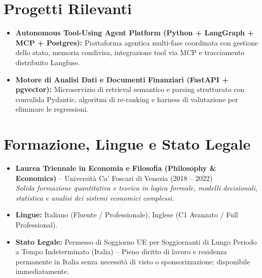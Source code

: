 \documentclass[a4paper,10pt]{article}
\begin{document}
\section{Progetti Rilevanti}
\begin{itemize}
  \item \textbf{Autonomous Tool-Using Agent Platform (Python + LangGraph + MCP + Postgres):} Piattaforma agentica multi-fase coordinata con gestione dello stato, memoria condivisa, integrazione tool via MCP e tracciamento distribuito Langfuse.
  \item \textbf{Motore di Analisi Dati e Documenti Finanziari (FastAPI + pgvector):} Microservizio di retrieval semantico e parsing strutturato con convalida Pydantic, algoritmi di re-ranking e harness di valutazione per eliminare le regressioni.
\end{itemize}

\section{Formazione, Lingue e Stato Legale}
\begin{itemize}
  \item \textbf{Laurea Triennale in Economia e Filosofia (Philosophy \& Economics)} -- Università Ca' Foscari di Venezia (2018 -- 2022) \\
  \textit{Solida formazione quantitativa e teorica in logica formale, modelli decisionali, statistica e analisi dei sistemi economici complessi.}
  \item \textbf{Lingue:} Italiano (Fluente / Professionale), Inglese (C1 Avanzato / Full Professional).
  \item \textbf{Stato Legale:} Permesso di Soggiorno UE per Soggiornanti di Lungo Periodo a Tempo Indeterminato (Italia) -- Pieno diritto di lavoro e residenza permanente in Italia senza necessità di visto o sponsorizzazione; disponibile immediatamente.
\end{itemize}
\end{document}
